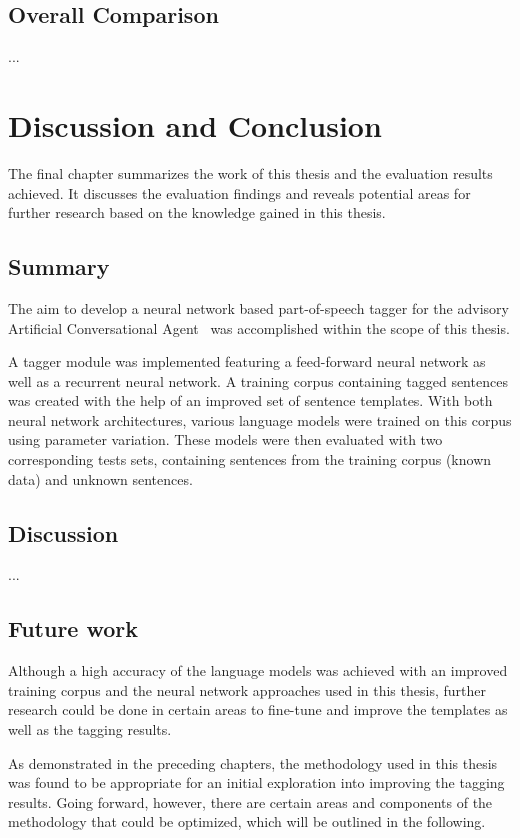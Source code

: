\section{Overall Comparison}\label{c.evaluation.comparison}
...

\chapter{Discussion and Conclusion}\label{c.conclusion}
The final chapter summarizes the work of this thesis and the evaluation results achieved. It discusses the evaluation findings and reveals potential areas for further research based on the knowledge gained in this thesis.

\section{Summary}\label{c.conclusion.summary}
The aim to develop a neural network based part-of-speech tagger for the advisory Artificial Conversational Agent \Alex\ was accomplished within the scope of this thesis.

A tagger module was implemented featuring a feed-forward neural network as well as a recurrent neural network. A training corpus containing tagged sentences was created with the help of an improved set of sentence templates. With both neural network architectures, various language models were trained on this corpus using parameter variation. These models were then evaluated with two corresponding tests sets, containing sentences from the training corpus (known data) and unknown sentences.

\section{Discussion}\label{c.conclusion.discussion}
...

\section{Future work}\label{c.conclusion.future}
Although a high accuracy of the language models was achieved with an improved training corpus and the neural network approaches used in this thesis, further research could be done in certain areas to fine-tune and improve the templates as well as the tagging results.

As demonstrated in the preceding chapters, the methodology used in this thesis was found to be appropriate for an initial exploration into improving the tagging results. Going forward, however, there are certain areas and components of the methodology that could be optimized, which will be outlined in the following.

